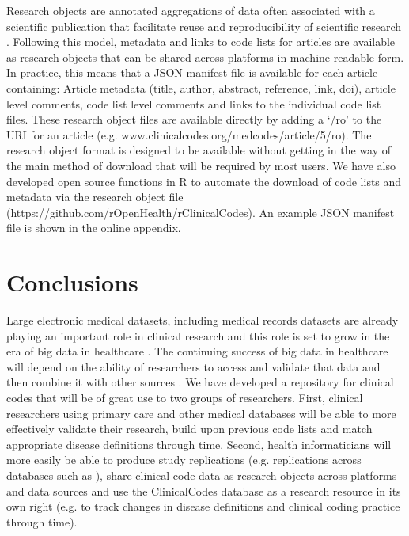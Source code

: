 \documentclass[10pt]{article}
\begin{document}

Research objects are annotated aggregations of data often associated with a scientific publication that facilitate reuse and reproducibility of scientific research \cite{Bechhofer2010}. Following this model, metadata and links to code lists for articles are available as research objects that can be shared across platforms in machine readable form.  In practice, this means that a JSON manifest file is available for each article containing: Article metadata (title, author, abstract, reference, link, doi), article level comments, code list level comments and links to the individual code list files. These research object files are available directly by adding a `/ro' to the URI for an article (e.g. www.clinicalcodes.org/medcodes/article/5/ro).  The research object format is designed to be available without getting in the way of the main method of download that will be required by most users.  We have also developed open source functions in R to automate the download of code lists and metadata via the research object file (https://github.com/rOpenHealth/rClinicalCodes). An example JSON manifest file is shown in the online appendix.

\section*{Conclusions}


Large electronic medical datasets, including medical records datasets are already playing an important role in clinical research and this role is set to grow in the era of big data in healthcare \cite{Wang2013}. The continuing success of big data in healthcare will depend on the ability of researchers to access and validate that data and then combine it with other sources \cite{Murdoch2013}.  We have developed a repository for clinical codes that will be of great use to two groups of researchers.  First, clinical researchers using primary care and other medical databases will be able to more effectively validate their research, build upon previous code lists and match appropriate disease definitions through time. Second, health informaticians will more easily be able to produce study replications (e.g. replications across databases such as \cite{Reeves2014}), share clinical code data as research objects across platforms and data sources and use the ClinicalCodes database as a research resource in its own right (e.g. to track changes in disease definitions and clinical coding practice through time).
\end{document}
